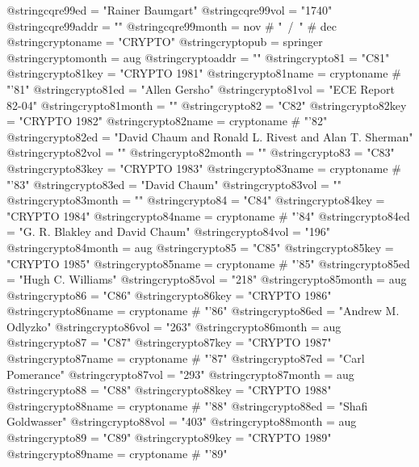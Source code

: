 @string{cqre99ed =              "Rainer Baumgart"}
@string{cqre99vol =             "1740"}
@string{cqre99addr =            ""}
@string{cqre99month =           nov # "~/~" # dec}
@string{cryptoname =            "CRYPTO"}
@string{cryptopub =             springer}
@string{cryptomonth =           aug}
@string{cryptoaddr =            ""}
@string{crypto81 =              "C81"}
@string{crypto81key =           "CRYPTO 1981"}
@string{crypto81name =          cryptoname # "'81"}
@string{crypto81ed =            "Allen Gersho"}
@string{crypto81vol =           "ECE Report 82-04"}
@string{crypto81month =         ""}
@string{crypto82 =              "C82"}
@string{crypto82key =           "CRYPTO 1982"}
@string{crypto82name =          cryptoname # "'82"}
@string{crypto82ed =            "David Chaum and Ronald L. Rivest and Alan T. Sherman"}
@string{crypto82vol =           ""}
@string{crypto82month =         ""}
@string{crypto83 =              "C83"}
@string{crypto83key =           "CRYPTO 1983"}
@string{crypto83name =          cryptoname # "'83"}
@string{crypto83ed =            "David Chaum"}
@string{crypto83vol =           ""}
@string{crypto83month =         ""}
@string{crypto84 =              "C84"}
@string{crypto84key =           "CRYPTO 1984"}
@string{crypto84name =          cryptoname # "'84"}
@string{crypto84ed =            "G. R. Blakley and David Chaum"}
@string{crypto84vol =           "196"}
@string{crypto84month =         aug}
@string{crypto85 =              "C85"}
@string{crypto85key =           "CRYPTO 1985"}
@string{crypto85name =          cryptoname # "'85"}
@string{crypto85ed =            "Hugh C. Williams"}
@string{crypto85vol =           "218"}
@string{crypto85month =         aug}
@string{crypto86 =              "C86"}
@string{crypto86key =           "CRYPTO 1986"}
@string{crypto86name =          cryptoname # "'86"}
@string{crypto86ed =            "Andrew M. Odlyzko"}
@string{crypto86vol =           "263"}
@string{crypto86month =         aug}
@string{crypto87 =              "C87"}
@string{crypto87key =           "CRYPTO 1987"}
@string{crypto87name =          cryptoname # "'87"}
@string{crypto87ed =            "Carl Pomerance"}
@string{crypto87vol =           "293"}
@string{crypto87month =         aug}
@string{crypto88 =              "C88"}
@string{crypto88key =           "CRYPTO 1988"}
@string{crypto88name =          cryptoname # "'88"}
@string{crypto88ed =            "Shafi Goldwasser"}
@string{crypto88vol =           "403"}
@string{crypto88month =         aug}
@string{crypto89 =              "C89"}
@string{crypto89key =           "CRYPTO 1989"}
@string{crypto89name =          cryptoname # "'89"}
